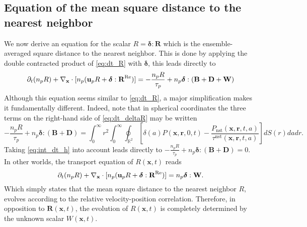 \subsection{Equation of the mean square distance to the nearest neighbor}

We now derive an equation for the scalar $R = \bm\delta : \textbf{R}$ which is the ensemble-averaged square distance to the nearest neighbor. 
This is done by applying the double contracted product of \ref{eq:dt_R} with $\bm\delta$, this leads directly to 
\begin{equation}
    \pddt (n_pR)
    + \pddx \cdot [n_p(\textbf{u}_pR
    + \bm\delta :\textbf{R}^\text{Re})]
    = 
    - \frac{n_pR}{\tau_p}
    +n_p  \bm\delta : (\textbf{B}+\textbf{D}+\textbf{W})
    \label{eq:dt_deltaR}
\end{equation}
Although this equation seems similar to \ref{eq:dt_R}, a major simplification makes it fundamentally different. 
Indeed, note that in spherical coordinates the three terms on the right-hand side of \ref{eq:dt_deltaR} may be written
\begin{equation*}
    - \frac{n_pR}{\tau_p}
    + n_p  \bm\delta : (\textbf{B}+\textbf{D})
    = 
    \int_0^\infty r^2 \int_{0}^{\infty}\oint_{\mathbb{R}^2}\left[
        \delta(a)P(\textbf{x},\textbf{r},0,t)
    - \frac{P_\text{nst}(\textbf{x},\textbf{r},t,a)}{\tau^\text{nst}(\textbf{x},\textbf{r},t,a)}
    \right]dS(r) da dr.
\end{equation*}
Taking \ref{eq:int_dt_h} into account leads directly to $- \frac{n_pR}{\tau_p} + n_p  \bm\delta : (\textbf{B}+\textbf{D}) = 0$. 
In other worlds, the transport equation of $R(\textbf{x},t)$ reads 
\begin{equation}
    \pddt (n_pR)
    + \pddx \cdot [n_p(\textbf{u}_pR
    + \bm\delta : \textbf{R}^\text{Re})]
    = 
    n_p\bm\delta : \textbf{W}. 
    \label{eq:dt_deltaR2}
\end{equation}
Which simply states that the mean square distance to the nearest neighbor $R$, evolves according to the relative velocity-position correlation.
Therefore, in opposition to $\textbf{R}(\textbf{x},t)$, the evolution of $R(\textbf{x},t)$ is completely determined by the unknown scalar $W(\textbf{x},t)$. 


